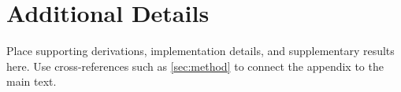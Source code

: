 \section{Additional Details}
\label{sec:appendix}
Place supporting derivations, implementation details, and supplementary
results here. Use cross-references such as \cref{sec:method} to connect the
appendix to the main text.
